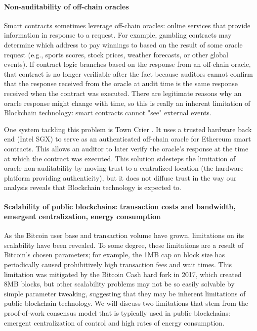 {\paragraph{Non-auditability of off-chain oracles}
Smart contracts sometimes leverage off-chain oracles: online services that provide information in response to a request. For example, gambling contracts may determine which address to pay winnings to based on the result of some oracle request (e.g., sports scores, stock prices, weather forecasts, or other global events). If contract logic branches based on the response from an off-chain oracle, that contract is no longer verifiable after the fact because auditors cannot confirm that the response received from the oracle at audit time is the same response received when the contract was executed. There are legitimate reasons why an oracle response might change with time, so this is really an inherent limitation of Blockchain technology: smart contracts cannot "see" external events.

One system tackling this problem is Town Crier \cite{Zhang16}. It uses a trusted hardware back end (Intel SGX) to serve as an authenticated off-chain oracle for Ethereum smart contracts. This allows an auditor to later verify the oracle's response at the time at which the contract was executed. This solution sidesteps the limitation of oracle non-auditability by moving trust to a centralized location (the hardware platform providing authenticity), but it does not diffuse trust in the way our analysis reveals that Blockchain technology is expected to.

\paragraph{Scalability of public blockchains: transaction costs and bandwidth, emergent centralization, energy consumption}
As the Bitcoin user base and transaction volume have grown, limitations on its scalability have been revealed. To some degree, these limitations are a result of Bitcoin's chosen parameters; for example, the 1MB cap on block size has periodically caused prohibitively high transaction fees and wait times. This limitation was mitigated by the Bitcoin Cash hard fork in 2017, which created 8MB blocks, but other scalability problems may not be so easily solvable by simple parameter tweaking, suggesting that they may be inherent limitations of public blockchain technology. We will discuss two limitations that stem from the proof-of-work consensus model that is typically used in public blockchains: emergent centralization of control and high rates of energy consumption.

}
